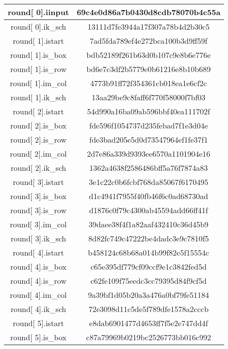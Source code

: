 \begin{center}

\begin{longtable}{|c|c|}
\hline
round[ 0].iinput&   69c4e0d86a7b0430d8cdb78070b4c55a\\
\hline
round[ 0].ik\_sch&   13111d7fe3944a17f307a78b4d2b30c5\\
\hline
round[ 1].istart&   7ad5fda789ef4e272bca100b3d9ff59f\\
\hline
round[ 1].is\_box&   bdb52189f261b63d0b107c9e8b6e776e\\
\hline
round[ 1].is\_row&   bd6e7c3df2b5779e0b61216e8b10b689\\
\hline
round[ 1].im\_col&   4773b91ff72f354361cb018ea1e6cf2c\\
\hline
round[ 1].ik\_sch&   13aa29be9c8faff6f770f58000f7bf03\\
\hline
round[ 2].istart&   54d990a16ba09ab596bbf40ea111702f\\
\hline
round[ 2].is\_box&   fde596f1054737d235febad7f1e3d04e\\
\hline
round[ 2].is\_row&   fde3bad205e5d0d73547964ef1fe37f1\\
\hline
round[ 2].im\_col&   2d7e86a339d9393ee6570a1101904e16\\
\hline
round[ 2].ik\_sch&   1362a4638f2586486bff5a76f7874a83\\
\hline
round[ 3].istart&   3e1c22c0b6fcbf768da85067f6170495\\
\hline
round[ 3].is\_box&   d1c4941f7955f40fb46f6c0ad68730ad\\
\hline
round[ 3].is\_row&   d1876c0f79c4300ab45594add66ff41f\\
\hline
round[ 3].im\_col&   39daee38f4f1a82aaf432410c36d45b9\\
\hline
round[ 3].ik\_sch&   8d82fc749c47222be4dadc3e9c7810f5\\
\hline
round[ 4].istart&   b458124c68b68a014b99f82e5f15554c\\
\hline
round[ 4].is\_box&   c65e395df779cf09ccf9e1c3842fed5d\\
\hline
round[ 4].is\_row&   c62fe109f75eedc3cc79395d84f9cf5d\\
\hline
round[ 4].im\_col&   9a39bf1d05b20a3a476a0bf79fe51184\\
\hline
round[ 4].ik\_sch&   72e3098d11c5de5f789dfe1578a2cccb\\
\hline
round[ 5].istart&   e8dab6901477d4653ff7f5e2e747dd4f\\
\hline
round[ 5].is\_box&   c87a79969b0219bc2526773bb016c992\\

\end{longtable}
\end{center}
